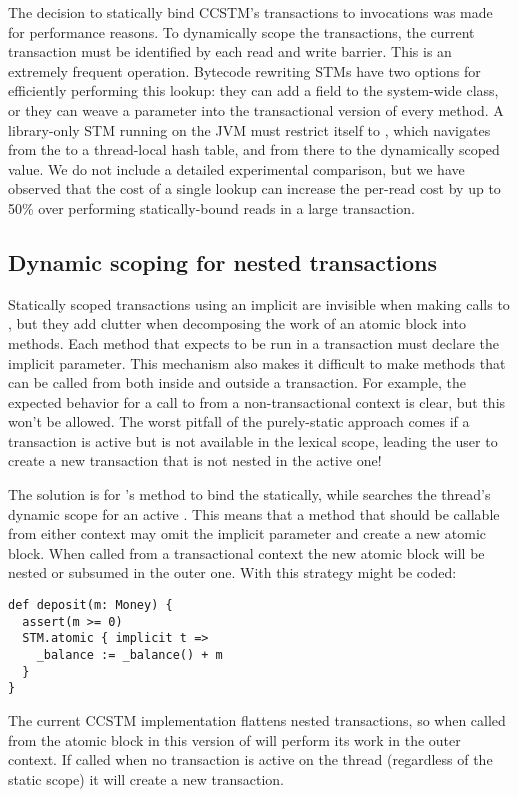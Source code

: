 The decision to statically bind CCSTM's transactions to 
invocations was made for performance reasons.  To dynamically scope
the transactions, the current transaction must be identified by each
read and write barrier.  This is an extremely frequent operation.
Bytecode rewriting STMs have two options for efficiently performing this
lookup: they can add a field to the system-wide  class,
or they can weave a  parameter into the transactional version
of every method.  A library-only STM running on the JVM must restrict
itself to , which navigates from the 
to a thread-local hash table, and from there to the dynamically scoped
value.  We do not include a detailed experimental comparison, but we
have observed that the cost of a single  lookup can
increase the per-read cost by up to 50\% over
performing statically-bound
reads in a large transaction.

\subsection{Dynamic scoping for nested transactions}
\label{sec:hybrid}

Statically scoped transactions using an implicit  are invisible
when making calls to , but they add clutter when decomposing the
work of an atomic block into methods.  Each method that expects to be run
in a transaction must declare the implicit parameter.  This mechanism also
makes it difficult to make methods that can be called from both inside and
outside a transaction.  For example, the expected behavior for a call to
 from a non-transactional context is clear, but this won't
be allowed.  The worst pitfall of the purely-static approach comes if a
transaction is active but is not available in the lexical scope, leading
the user to create a new transaction that is not nested in the active one!

The solution is for 's method to bind the  statically,
while  searches the thread's dynamic scope for an active
.  This means that a method that should be callable from either
context may omit the implicit  parameter and create a new atomic
block.  When called from a transactional context the new atomic block will
be nested or subsumed in the outer one.  With this strategy 
might be coded:

\lstset{numbers=none}
\lstset{xleftmargin=0.125in}
\begin{lstlisting}
def deposit(m: Money) {
  assert(m >= 0)
  STM.atomic { implicit t =>
    _balance := _balance() + m
  }
}
\end{lstlisting}
\lstset{numbers=left}
\lstset{xleftmargin=0.25in}

The current CCSTM implementation flattens nested transactions, so
when called from the atomic block in  this version of
 will perform its work in the outer context.  If called
when no transaction is active on the thread (regardless of the static
scope) it will create a new transaction.
